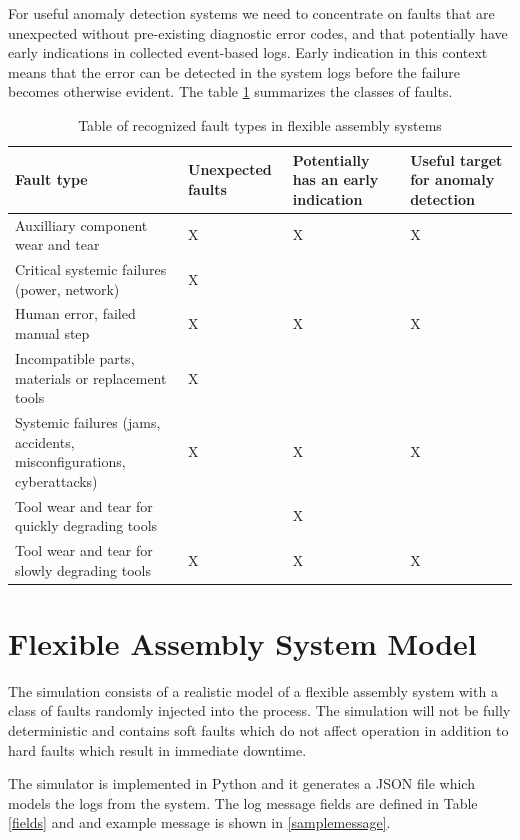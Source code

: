 \documentclass[journal]{IEEEtran}
\begin{document}
For useful anomaly detection systems we need to concentrate on faults that are unexpected without pre-existing diagnostic error codes, and that potentially have early indications
in collected event-based logs. Early indication in this context means that the error can be detected in the system logs before the failure becomes otherwise evident.
The table \ref{faults} summarizes the classes of faults.

\begin{table}[!t]
\renewcommand{\arraystretch}{1.3}
\caption{Table of recognized fault types in flexible assembly systems}
\label{faults}
\centering
\begin{tabular}{|p{25mm}|p{15mm}|p{15mm}|p{15mm}|}
\hline
Fault type & Unexpected faults & Potentially has an early indication & Useful target for anomaly detection \\
\hline
\hline
Auxilliary component wear and tear & X & X & X \\
\hline
Critical systemic failures (power, network) & X & & \\
\hline
Human error, failed manual step & X & X & X \\
\hline
Incompatible parts, materials or replacement tools & X & & \\
\hline
Systemic failures (jams, accidents, misconfigurations, cyberattacks) & X & X & X \\
\hline
Tool wear and tear for quickly degrading tools & & X & \\
\hline
Tool wear and tear for slowly degrading tools & X & X & X \\
\hline
\end{tabular}
\end{table}

\section{Flexible Assembly System Model}

The simulation consists of a realistic model of a flexible assembly system with a class of faults randomly injected into the process.
The simulation will not be fully deterministic and contains soft faults which do not affect operation in addition to hard faults which result in immediate downtime.

The simulator is implemented in Python and it generates a JSON file which models the logs from the system. The log message fields are defined in Table \ref{fields} and
and example message is shown in \ref{samplemessage}.
\end{document}
